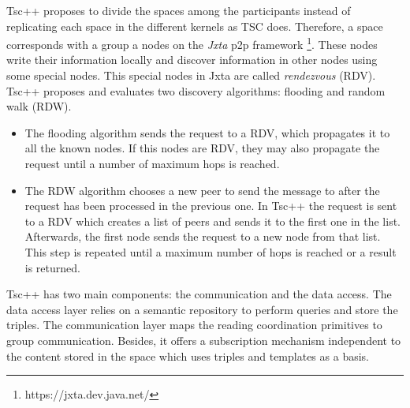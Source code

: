 Tsc++ proposes to divide the spaces among the participants instead of replicating each space in the different kernels as TSC does.
Therefore, a space corresponds with a group a nodes on the \emph{Jxta} \ac{p2p} framework \footnote{https://jxta.dev.java.net/}. %
These nodes write their information locally and discover information in other nodes using some special nodes.
This special nodes in Jxta are called \emph{rendezvous} (RDV).
Tsc++ proposes and evaluates two discovery algorithms: flooding and random walk (RDW).
\begin{itemize}
  \item The flooding algorithm sends the request to a RDV, which propagates it to all the known nodes.
	If this nodes are RDV, they may also propagate the request until a number of maximum hops is reached.
  \item The RDW algorithm chooses a new peer to send the message to after the request has been processed in the previous one.
	In Tsc++ the request is sent to a RDV which creates a list of peers and sends it to the first one in the list.
	Afterwards, the first node sends the request to a new node from that list.
	This step is repeated until a maximum number of hops is reached or a result is returned.
\end{itemize}


Tsc++ has two main components: the communication and the data access.
The data access layer relies on a semantic repository to perform queries and store the triples.
The communication layer maps the reading coordination primitives to group communication.
Besides, it offers a subscription mechanism independent to the content stored in the space which uses triples and templates as a basis.





